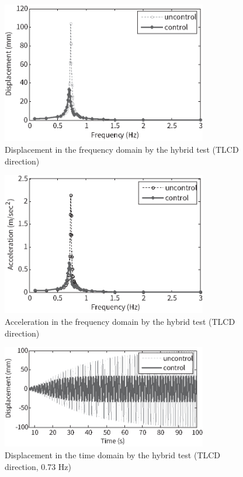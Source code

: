\begin{figure}[ht]
\centering
\includegraphics[width=0.8\textwidth] {figure/5-22.eps}
\caption{Displacement in the frequency domain by the hybrid test (TLCD direction)}
\label{fig:5-22}
\end{figure}

\begin{figure}[ht]
\centering
\includegraphics[width=0.8\textwidth] {figure/5-23.eps}
\caption{Acceleration in the frequency domain by the hybrid test (TLCD direction)}
\label{fig:5-23}
\end{figure}

\begin{figure}[ht]
\centering
\includegraphics[width=0.8\textwidth] {figure/5-24.eps}
\caption{Displacement in the time domain by the hybrid test (TLCD direction, 0.73 Hz)}
\label{fig:5-24}
\end{figure}

